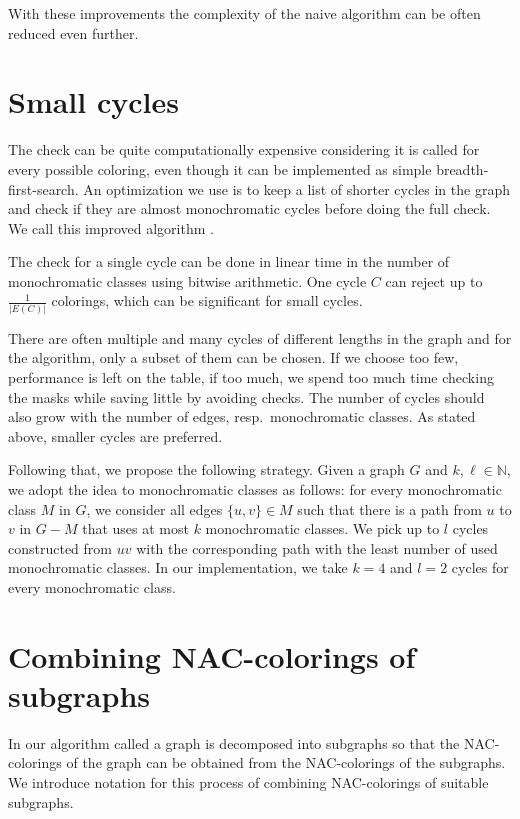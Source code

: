 With these improvements the complexity of the naive algorithm can be often
reduced even further.

\section{Small cycles}%
\label{sec:small_cycles}

The check \IsNACColoring{} can be quite computationally expensive
considering it is called for every possible coloring,
even though it can be implemented as simple breadth-first-search.
An optimization we use is to keep a list of shorter cycles in the graph and
check if they are almost monochromatic cycles before doing the full check.
We call this improved \Naive{} algorithm \NaiveCycles{}.

The check for a single cycle can be done in linear time
in the number of monochromatic classes using bitwise arithmetic.
One cycle $C$ can reject up to $\frac{1}{|E(C)|}$ colorings,
which can be significant for small cycles.

There are often multiple and many cycles of different lengths in the graph
and for the algorithm, only a subset of them can be chosen.
If we choose too few, performance is left on the table, if too much,
we spend too much time checking the masks while saving little
by avoiding \IsNACColoring{} checks.
The number of cycles should also grow with the number of edges,
resp.\ monochromatic classes.
As stated above, smaller cycles are preferred.

Following that, we propose the following strategy.
Given a graph $G$ and $k,\ell\in \mathbb{N}$,
we adopt the idea to monochromatic classes as follows:
for every monochromatic class $M$ in $G$,
we consider all edges $\{u, v\} \in M$ such that there is a path from $u$ to $v$
in $G - M$ that uses at most $k$ monochromatic classes.
We pick up to $l$ cycles constructed from $uv$ with the corresponding
path with the least number of used monochromatic classes.
In our implementation, we take $k=4$ and $l=2$ cycles for every monochromatic class.

\section{Combining NAC-colorings of subgraphs}%
\label{sec:combining}

In our algorithm called \Subgraphs{} a graph is decomposed into subgraphs so that
the NAC-colorings of the graph can be obtained from the NAC-colorings of the subgraphs.
We introduce notation for this process of combining NAC-colorings of suitable subgraphs.

